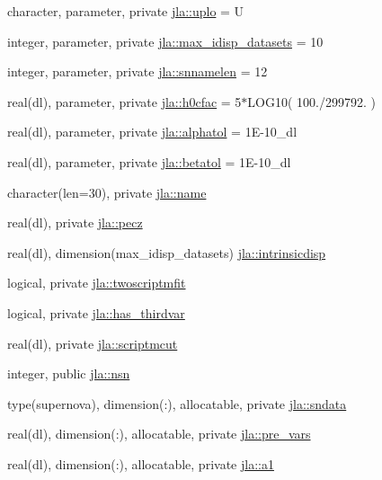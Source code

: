 \begin{DoxyCompactItemize}
\item 
character, parameter, private \mbox{\hyperlink{namespacejla_ae9dda5d2cfb1fec80f10dea135ea407e}{jla\+::uplo}} = \textquotesingle{}U\textquotesingle{}
\item 
integer, parameter, private \mbox{\hyperlink{namespacejla_a15038ba72bb06d328f2c43f0d0dd5a53}{jla\+::max\+\_\+idisp\+\_\+datasets}} = 10
\item 
integer, parameter, private \mbox{\hyperlink{namespacejla_a211c3f57dbbc51d6959058d935cc0fb6}{jla\+::snnamelen}} = 12
\item 
real(dl), parameter, private \mbox{\hyperlink{namespacejla_ac0c65fbeb2a567849038727459759c29}{jla\+::h0cfac}} = 5$\ast$L\+O\+G10( 100./299792. )
\item 
real(dl), parameter, private \mbox{\hyperlink{namespacejla_a0298c9010520a99e272978ce5f61a83a}{jla\+::alphatol}} = 1\+E-\/10\+\_\+dl
\item 
real(dl), parameter, private \mbox{\hyperlink{namespacejla_a5ef48a10dbf7795c2f5d30b11434bbd4}{jla\+::betatol}} = 1\+E-\/10\+\_\+dl
\item 
character(len=30), private \mbox{\hyperlink{namespacejla_a344f6058fc2504417d29ec6990051554}{jla\+::name}}
\item 
real(dl), private \mbox{\hyperlink{namespacejla_a5f4aaf92cb5a44de1cce93628083b789}{jla\+::pecz}}
\item 
real(dl), dimension(max\+\_\+idisp\+\_\+datasets) \mbox{\hyperlink{namespacejla_a20678b08d3fa64ee1a64c9ff41d1cdf9}{jla\+::intrinsicdisp}}
\item 
logical, private \mbox{\hyperlink{namespacejla_a6aade81a34ccb4e5795d2141aeace91d}{jla\+::twoscriptmfit}}
\item 
logical, private \mbox{\hyperlink{namespacejla_a340aa04c1acf8e62ad8fe9261de0ad91}{jla\+::has\+\_\+thirdvar}}
\item 
real(dl), private \mbox{\hyperlink{namespacejla_af11758b53916846ed4875f3664797cb4}{jla\+::scriptmcut}}
\item 
integer, public \mbox{\hyperlink{namespacejla_aff413afd9288880fbc89d3a1f24f60eb}{jla\+::nsn}}
\item 
type(supernova), dimension(\+:), allocatable, private \mbox{\hyperlink{namespacejla_a9e2b90e3f1e2fbd40d61e0ad31bb2684}{jla\+::sndata}}
\item 
real(dl), dimension(\+:), allocatable, private \mbox{\hyperlink{namespacejla_aa01e50e6176267ba591eec0a0f61bfa2}{jla\+::pre\+\_\+vars}}
\item 
real(dl), dimension(\+:), allocatable, private \mbox{\hyperlink{namespacejla_af953b413735d88b2fb4acce3a491e092}{jla\+::a1}}

\end{DoxyCompactItemize}
